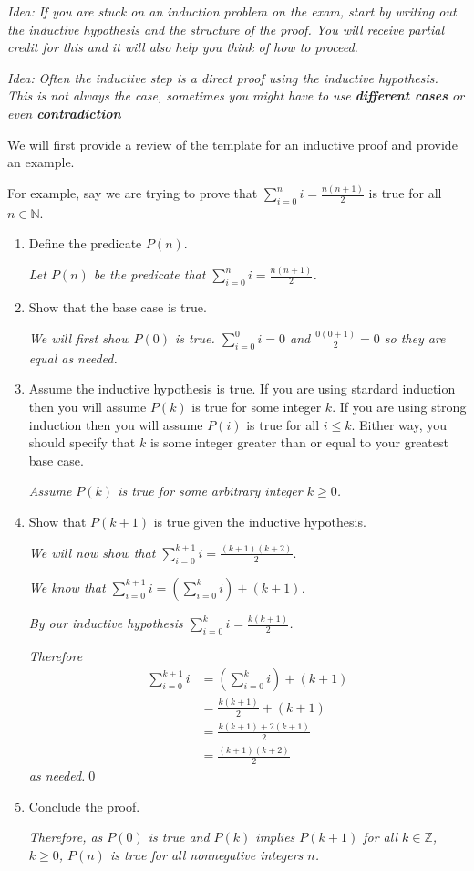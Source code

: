 \documentclass[12pt,letterpaper]{article}
\newcommand{\idea}{\textit{Idea:} }
\newcommand\Z{\mathbb Z}
\begin{document}
\idea \textit{If you are stuck on an induction problem on the exam, start by writing out the inductive hypothesis and the structure of the proof. You will receive partial credit for this and it will also help you think of how to proceed.}

\idea \textit{Often the inductive step is a direct proof using the inductive hypothesis. This is not always the case, sometimes you might have to use \textbf{different cases} or even \textbf{contradiction}}

We will first provide a review of the template for an inductive proof and provide an example.

      For example, say we are trying to prove that $\sum_{i=0}^n i = \frac{n(n+1)}{2}$ is true for all $n \in \mathbb{N}$. 

      \begin{enumerate}
        \item Define the predicate $P(n)$.

        \textit{Let $P(n)$ be the predicate that $\sum_{i=0}^n i = \frac{n(n+1)}{2}$.}

        \item Show that the base case is true.

        \textit{We will first show $P(0)$ is true. $\sum_{i=0}^0 i = 0$ and $\frac{0(0+1)}{2} = 0$ so they are equal as needed.}

        \item Assume the inductive hypothesis is true. If you are using stardard induction then you will assume 
			$P(k)$ is true for some integer $k$. If you are using strong induction then you will assume $P(i)$ is true for all $i \leq k$. Either way, you should specify that $k$ is some integer greater than or equal to your greatest base case.

        \textit{Assume $P(k)$ is true for some arbitrary integer $k \geq 0$.}

        \item Show that $P(k+1)$ is true given the inductive hypothesis.

		\textit{We will now show that  $\sum_{i=0}^{k+1} i = \frac{(k+1)(k+2)}{2}$}.

       	\textit{We know that $\sum_{i=0}^{k+1} i = \left( \sum_{i=0}^{k} i \right)+ (k+1)$.}

		\textit{By our inductive hypothesis $\sum_{i=0}^k i = \frac{k(k+1)}{2}$.}

         \textit{Therefore}
		\begin{align*}
			\sum_{i=0}^{k+1} i &= \left( \sum_{i=0}^{k} i \right)+ (k+1) \\
			&=  \frac{k(k+1)}{2} + (k+1) \\
			&= \frac{k(k+1) + 2(k+1)}{2} \\
			&= \frac{(k+1)(k+2)}{2}
		\end{align*}
		\textit{as needed.}\qed

        \item Conclude the proof.
        
        \textit{Therefore, as $P(0)$ is true and $P(k)$ implies $P(k+1)$ for all $k \in \Z$, $k \geq 0$, $P(n)$ is true for all nonnegative integers $n$.}
      \end{enumerate}
\end{document}
